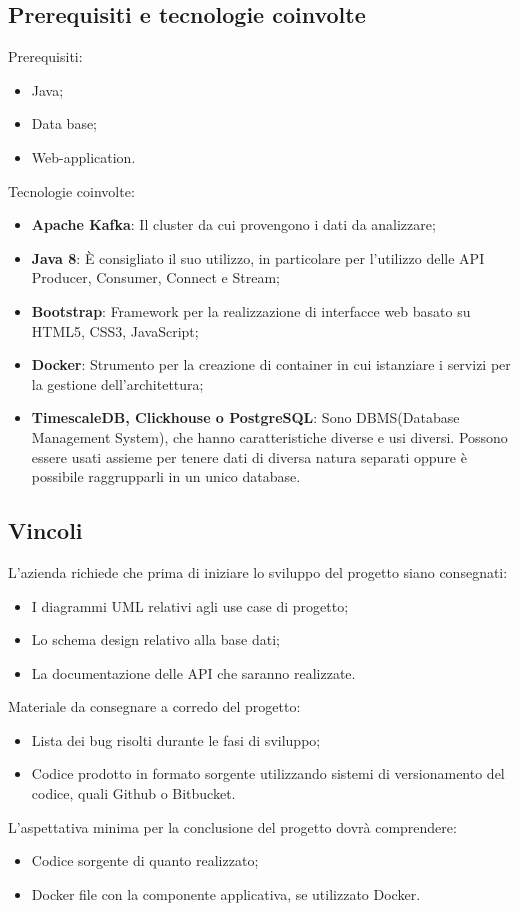 \subsection{Prerequisiti e tecnologie coinvolte}
Prerequisiti:
\begin{itemize}
\item Java;	
\item Data base;
\item Web-application.
\end{itemize}
Tecnologie coinvolte:
\begin{itemize}
\item \textbf{Apache Kafka}: Il cluster da cui provengono i dati da analizzare;
\item \textbf{Java 8}: È consigliato il suo utilizzo, in particolare per l'utilizzo delle API Producer, Consumer, Connect e Stream;
\item \textbf{Bootstrap}: Framework per la realizzazione di interfacce web basato su HTML5, CSS3, JavaScript;
\item \textbf{Docker}: Strumento per la creazione di container in cui istanziare i servizi per la gestione dell'architettura;
\item \textbf{TimescaleDB, Clickhouse o PostgreSQL}: Sono DBMS(Database Management System), che hanno caratteristiche diverse e usi diversi. Possono essere usati assieme per tenere dati di diversa natura separati oppure \`e possibile raggrupparli in un unico database.
\end{itemize}

\subsection{Vincoli}
L'azienda richiede che prima di iniziare lo sviluppo del progetto siano consegnati:
\begin{itemize}
\item I diagrammi UML relativi agli use case di progetto;
\item Lo schema design relativo alla base dati;
\item La documentazione delle API che saranno realizzate. 
\end{itemize}
Materiale da consegnare a corredo del progetto: 
\begin{itemize}
\item Lista dei bug risolti durante le fasi di sviluppo;
\item Codice prodotto in formato sorgente utilizzando sistemi di versionamento del codice, quali Github o Bitbucket.
\end{itemize}
L'aspettativa minima per la conclusione del progetto dovr\`a comprendere: 
\begin{itemize}
\item Codice sorgente di quanto realizzato;
\item Docker file con la componente applicativa, se utilizzato Docker.
\end{itemize}

